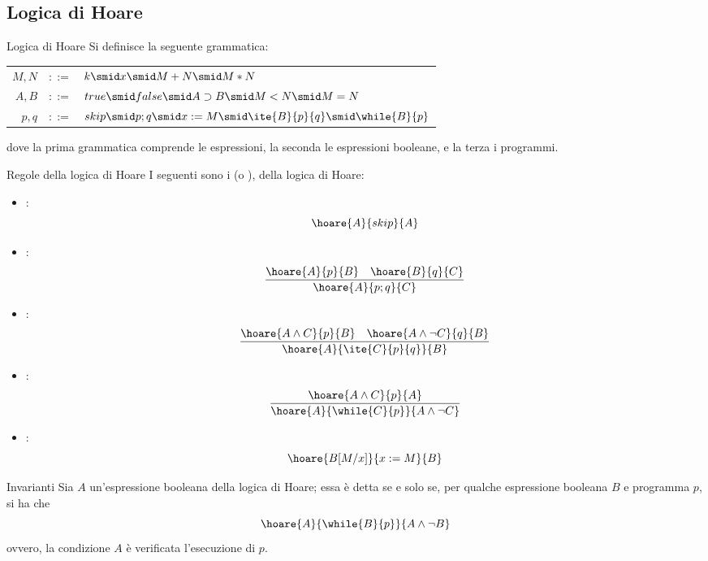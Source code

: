 \documentclass[a4paper, 12pt]{report}
\begin{document}
    \subsection{Logica di Hoare}

    \begin{frameddefn}[label={hoare logic}]{Logica di Hoare}
        Si definisce  la seguente grammatica:

        \begin{center}
            \begin{tabular}{rcl}
                $M, N$ & $::=$ & $k \smid x \smid M + N \smid M * N$ \\
                $A, B$ & $::=$ & $true \smid false \smid A \supset B \smid M <  N \smid M = N$ \\
                $p, q$ & $::=$ & $skip \smid p;q \smid x:=M \smid \ite{B}{p}{q} \smid \while{B}{p}$ \\
            \end{tabular}
        \end{center}

        dove la prima grammatica comprende le espressioni, la seconda le espressioni booleane, e la terza i programmi.
    \end{frameddefn}

    \begin{framedprop}[breakable]{Regole della logica di Hoare}
        I seguenti sono i  (o ), della logica di Hoare:

        \begin{itemize}
            \item {}: $$\hoare{A}{skip}{A}$$
            \item {}: $$\dfrac{\hoare{A}{p}{B} \quad \hoare{B}{q}{C}}{\hoare{A}{p;q}{C}}$$
            \item {}: $$\dfrac{\hoare{A \land C}{p}{B} \quad \hoare{A \land \lnot C}{q}{B}}{\hoare{A}{\ite{C}{p}{q}}{B}}$$
            \item {}: $$\dfrac{\hoare{A \land C}{p}{A}}{\hoare{A}{\while{C}{p}}{A \land \lnot C}}$$
            \item {}: $$\hoare{B[M/x]}{x := M}{B}$$
        \end{itemize}
    \end{framedprop}

    \begin{frameddefn}{Invarianti}
        Sia $A$ un'espressione booleana della logica di Hoare; essa è detta  se e solo se, per qualche espressione booleana $B$ e programma $p$, si ha che $$\hoare{A}{\while{B}{p}}{A \land \lnot B}$$ ovvero, la condizione $A$ è verificata  l'esecuzione di $p$.
    \end{frameddefn}
\end{document}
